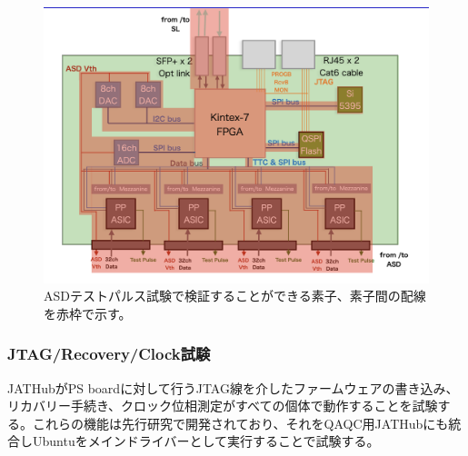\begin{figure} 
\centering
\includegraphics[width=16cm]{fig/QAQC/QAQCasdtpelements.png}
\caption[ASDテストパルス試験で検証できる素子]{ASDテストパルス試験で検証することができる素子、素子間の配線を赤枠で示す。}
\label{QAQCasdtpelements}
\end{figure}

\subsubsection{JTAG/Recovery/Clock試験}
\label{subsubsec_jtag}
JATHubがPS boardに対して行うJTAG線を介したファームウェアの書き込み、リカバリー手続き、クロック位相測定がすべての個体で動作することを試験する。これらの機能は先行研究で開発されており、それをQAQC用JATHubにも統合しUbuntuをメインドライバーとして実行することで試験する。

